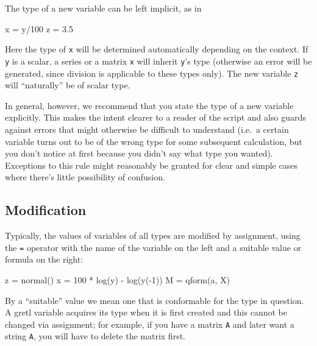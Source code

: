 The type of a new variable can be left implicit, as in
\begin{code}
x = y/100
z = 3.5
\end{code}
Here the type of \texttt{x} will be determined automatically depending
on the context.  If \texttt{y} is a scalar, a series or a matrix
\texttt{x} will inherit \texttt{y}'s type (otherwise an error will be
generated, since division is applicable to these types only). The new
variable \texttt{z} will ``naturally'' be of scalar type.

In general, however, we recommend that you state the type of a new
variable explicitly. This makes the intent clearer to a reader of the
script and also guards against errors that might otherwise be
difficult to understand (i.e.\ a certain variable turns out to be of
the wrong type for some subsequent calculation, but you don't notice
at first because you didn't say what type you wanted). Exceptions to
this rule might reasonably be granted for clear and simple cases where
there's little possibility of confusion.

\subsection{Modification}

Typically, the values of variables of all types are modified
by assignment, using the \texttt{=} operator with the name of the
variable on the left and a suitable value or formula on the right:

\begin{code}
z = normal()
x = 100 * log(y) - log(y(-1))
M = qform(a, X)
\end{code}

By a ``suitable'' value we mean one that is conformable for the type
in question. A gretl variable acquires its type when it is first
created and this cannot be changed via assignment; for example, if you
have a matrix \texttt{A} and later want a string \texttt{A}, you will
have to delete the matrix first.



